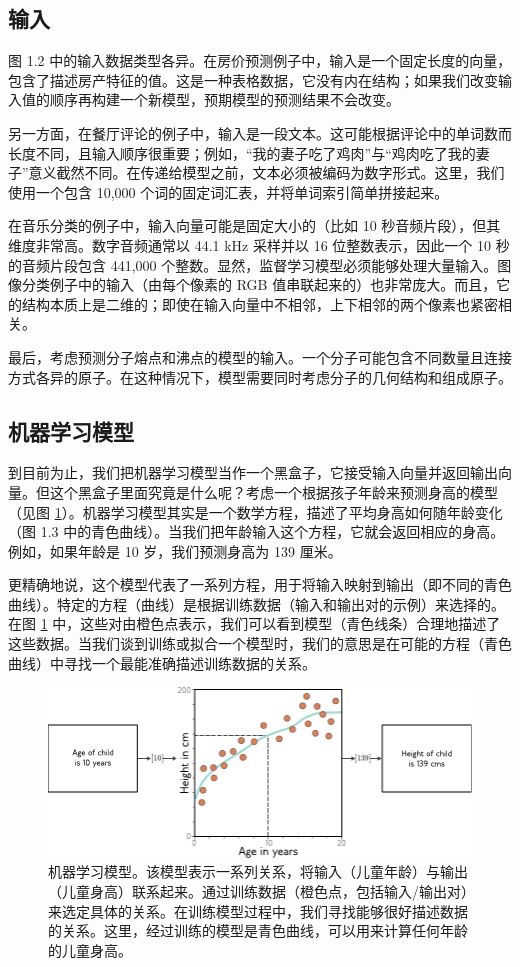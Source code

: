 \documentclass[lang=cn,newtx,10pt,scheme=chinese]{elegantbook}
\begin{document}
\subsection{输入}
图 1.2 中的输入数据类型各异。在房价预测例子中，输入是一个固定长度的向量，包含了描述房产特征的值。这是一种表格数据，它没有内在结构；如果我们改变输入值的顺序再构建一个新模型，预期模型的预测结果不会改变。

另一方面，在餐厅评论的例子中，输入是一段文本。这可能根据评论中的单词数而长度不同，且输入顺序很重要；例如，“我的妻子吃了鸡肉”与“鸡肉吃了我的妻子”意义截然不同。在传递给模型之前，文本必须被编码为数字形式。这里，我们使用一个包含 10,000 个词的固定词汇表，并将单词索引简单拼接起来。

在音乐分类的例子中，输入向量可能是固定大小的（比如 10 秒音频片段），但其维度非常高。数字音频通常以 44.1 kHz 采样并以 16 位整数表示，因此一个 10 秒的音频片段包含 441,000 个整数。显然，监督学习模型必须能够处理大量输入。图像分类例子中的输入（由每个像素的 RGB 值串联起来的）也非常庞大。而且，它的结构本质上是二维的；即使在输入向量中不相邻，上下相邻的两个像素也紧密相关。

最后，考虑预测分子熔点和沸点的模型的输入。一个分子可能包含不同数量且连接方式各异的原子。在这种情况下，模型需要同时考虑分子的几何结构和组成原子。

\subsection{机器学习模型}
到目前为止，我们把机器学习模型当作一个黑盒子，它接受输入向量并返回输出向量。但这个黑盒子里面究竟是什么呢？考虑一个根据孩子年龄来预测身高的模型（见图 \ref{IntroAgeHeight}）。机器学习模型其实是一个数学方程，描述了平均身高如何随年龄变化（图 1.3 中的青色曲线）。当我们把年龄输入这个方程，它就会返回相应的身高。例如，如果年龄是 10 岁，我们预测身高为 139 厘米。

更精确地说，这个模型代表了一系列方程，用于将输入映射到输出（即不同的青色曲线）。特定的方程（曲线）是根据训练数据（输入和输出对的示例）来选择的。在图 \ref{IntroAgeHeight} 中，这些对由橙色点表示，我们可以看到模型（青色线条）合理地描述了这些数据。当我们谈到训练或拟合一个模型时，我们的意思是在可能的方程（青色曲线）中寻找一个最能准确描述训练数据的关系。

\begin{figure}
	\centering
	\includegraphics[width=0.7\linewidth]{PDFFigures/UDLChap1PDF/IntroAgeHeight.pdf}
	\caption{机器学习模型。该模型表示一系列关系，将输入（儿童年龄）与输出（儿童身高）联系起来。通过训练数据（橙色点，包括输入/输出对）来选定具体的关系。在训练模型过程中，我们寻找能够很好描述数据的关系。这里，经过训练的模型是青色曲线，可以用来计算任何年龄的儿童身高。}
  \label{IntroAgeHeight}
\end{figure}
\end{document}
